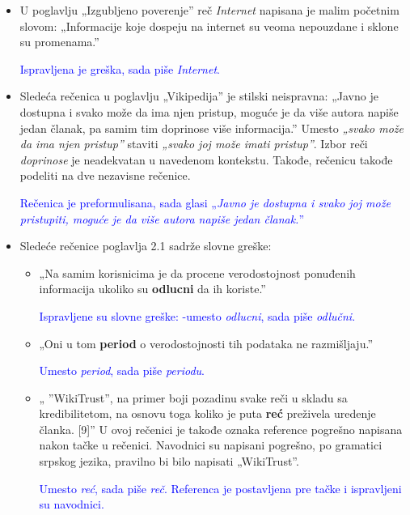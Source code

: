 \documentclass[a4paper]{report}
\newcommand{\odgovor}[1]{\textcolor{blue}{#1}}
\begin{document}
\begin{itemize}
    \item U poglavlju „Izgubljeno poverenje” reč \textit{Internet} napisana je malim početnim slovom:\newline
    „Informacije koje dospeju na internet su veoma nepouzdane i sklone su promenama.”
   
    \odgovor{Ispravljena je greška, sada piše \textit{Internet}.}
\end{itemize}
\begin{itemize}
    \item  Sledeća rečenica u poglavlju „Vikipedija” je stilski neispravna:\newline
    „Javno je dostupna i svako može da ima njen pristup, moguće je da više autora napiše jedan članak, pa samim tim doprinose više informacija.”\newline
    Umesto \textit{„svako može da ima njen pristup”} staviti \textit{„svako joj može imati pristup”}. Izbor reči \textit{doprinose} je neadekvatan u navedenom kontekstu. Takođe, rečenicu takođe podeliti na dve nezavisne rečenice.
    
    \odgovor{Rečenica je preformulisana, sada glasi „\textit{Javno je dostupna i svako joj može pristupiti, moguće je da više autora napiše jedan članak.}”}
    
\end{itemize}
\begin{itemize}
    \item Sledeće rečenice poglavlja 2.1 sadrže slovne greške:
    \begin{itemize}
        \item  „Na samim korisnicima je da procene verodostojnost ponuđenih informacija ukoliko su \textbf{odlucni} da ih koriste.”
       
        \odgovor{Ispravljene su slovne greške: -umesto \textit{odlucni}, sada piše \textit{odlučni}.}
    
	\end{itemize}
    \begin{itemize}
        \item  „Oni u tom \textbf{period} o verodostojnosti tih podataka ne razmišljaju.”
        
        \odgovor{Umesto \textit{period}, sada piše \textit{periodu}.}
        
    \end{itemize}
    \begin{itemize}
        \item  „ ”WikiTrust”, na primer boji pozadinu
svake reči u skladu sa kredibilitetom, na osnovu toga koliko je puta \textbf{reć} preživela uredenje članka. [9]”\newline
U ovoj rečenici je takođe oznaka reference pogrešno napisana nakon tačke u rečenici. Navodnici su napisani pogrešno, po gramatici srpskog jezika, pravilno bi bilo napisati „WikiTrust”.
	
	\odgovor{Umesto \textit{reć}, sada piše \textit{reč}. Referenca je postavljena pre tačke i ispravljeni su navodnici.}
	
    \end{itemize}
\end{itemize}
\end{document}
